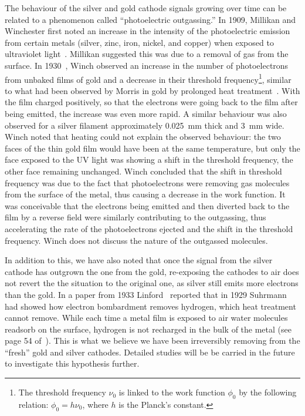\documentclass[a4paper,11pt]{article}
\begin{document}
The behaviour of the silver and gold cathode signals growing over time can be related to a phenomenon called ``photoelectric outgassing.'' In 1909, Millikan and Winchester first noted an increase in the intensity of the photoelectric emission from certain metals (silver, zinc, iron, nickel, and copper) when exposed to ultraviolet light~\cite{Millikan1909}. Millikan suggested this was due to a removal of gas from the surface. In 1930~\cite{Winch1930}, Winch observed an increase in the number of photoelectrons from unbaked films of gold and a decrease in their threshold frequency\footnote{The threshold frequency $\nu_0$ is linked to the work function $\phi_0$ by the following relation: $\phi_0 = h\nu_0$, 
where $h$ is the Planck's constant.}, similar to what had been observed by Morris in gold by prolonged heat treatment~\cite{Morris}. With the film charged positively, so that the electrons were going back to the film after being emitted, the increase was even more rapid. A similar behaviour was also observed for a silver filament approximately \SI{0.025}{mm} thick and \SI{3}{mm} wide. Winch noted that heating could not explain the observed behaviour: the two faces of the thin gold film would have been at the same temperature, but only the face exposed to the UV light was showing a shift in the threshold frequency, the other face remaining unchanged. Winch concluded that the shift in threshold frequency was due to the fact that photoelectrons were removing gas molecules from the surface of the metal, thus causing a decrease in the work function. It was conceivable that the electrons being emitted and then diverted back to the film by a reverse field were similarly contributing to the outgassing, thus accelerating the rate of the photoelectrons ejected and the shift in the threshold frequency. Winch does not discuss the nature of the outgassed molecules. 

In addition to this, we have also noted that once the signal from the silver cathode has outgrown the one from the gold, re-exposing the cathodes to air does not revert the the situation to the original one, as silver still emits more electrons than the gold. 
In a paper from 1933 Linford~\cite{Linford} reported that in 1929 Suhrmann had showed how electron bombardment removes hydrogen, which heat treatment cannot remove. 
While each time a metal film is exposed to air water molecules readsorb on the surface, hydrogen is not recharged in the bulk of the metal (see page 54 of~\cite{Linford}). This is what we believe we have been irreversibly removing from the ``fresh'' gold and silver cathodes. Detailed studies will be be carried in the future to investigate this hypothesis further. 
\end{document}

